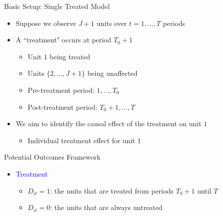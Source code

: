 \documentclass[hyperref={pdfpagelabels=false}]{beamer}
\begin{document}
\begin{frame}{Basic Setup: Single Treated Model}
\begin{itemize}
\item Suppose we observe $J+1$ units over $t=1,...,T$ periods
\vspace{0.2cm}
\item A ``treatment" occurs at period $T_0+1$
\vspace{0.2cm}
\begin{itemize}	
\item Unit $1$ being treated
\vspace{0.2cm}
\item Units $\{2,...,J+1\}$ being unaffected 
\vspace{0.2cm}
\item Pre-treatment period: $1,\ldots,T_0$	
\vspace{0.2cm}	
\item Post-treatment period: $T_0+1,\ldots,T$	
\vspace{0.2cm} 
\end{itemize}

\item We aim to identify the causal effect of the treatment on unit $1$

\vspace{0.2cm} 
\begin{itemize}
\item Individual treatment effect for unit $1$
\end{itemize}
\end{itemize}

\end{frame}


\begin{frame}{Potential Outcomes Framework}{}
	\begin{itemize}
		
		\item \textcolor{blue}{Treatment}
		\begin{itemize}
			\vspace{0.2cm}
			\item $D_{it}=1$: the units that are treated from periods $T_0+1$ until $T$
			\vspace{0.2cm}
			\item $D_{it}=0$: the units that are always untreated
		\end{itemize}
		
	\end{itemize}
\end{frame}
\end{document}

